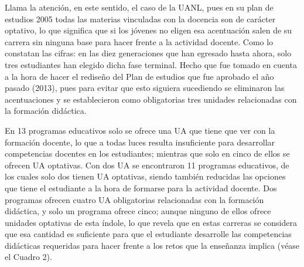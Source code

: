 \enlargethispage{\baselineskip}
Llama la atención, en este sentido, el caso de la UANL, pues en su plan de estudios 
2005 todas las materias vinculadas con la docencia son de carácter optativo, lo que 
significa que si los jóvenes no eligen esa acentuación salen de su 
carrera sin ninguna base para hacer frente a la actividad docente. Como lo 
constatan las cifras: en las diez generaciones que han egresado hasta ahora, 
solo tres estudiantes han elegido dicha fase terminal. Hecho que fue tomado en 
cuenta a la hora de hacer el rediseño del Plan de estudios que fue aprobado el año 
pasado (2013), pues para evitar que esto siguiera sucediendo se eliminaron las 
acentuaciones y se establecieron como obligatorias tres unidades 
relacionadas con la formación didáctica.  

En 13 programas educativos solo se ofrece una UA que tiene que ver con 
la formación docente, lo que a todas luces resulta insuficiente para 
desarrollar competencias docentes en los estudiantes; mientras que 
solo en cinco de ellos se ofrecen UA optativas. Con dos UA se encontraron 
11  programas educativos, de los cuales solo dos tienen UA optativas, 
siendo también reducidas las opciones que tiene el estudiante a la hora de 
formarse para la actividad docente.  Dos programas ofrecen cuatro UA obligatorias 
relacionadas con la formación didáctica, y solo un programa ofrece 
cinco; aunque ninguno de ellos ofrece unidades optativas de esta 
índole, lo que revela que en estas carreras se considera que esa cantidad 
es suficiente para que el estudiante desarrolle las competencias didácticas 
requeridas para hacer frente a los retos que la enseñanza implica (véase el Cuadro 2). 


